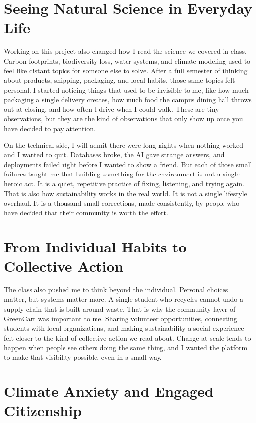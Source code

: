 \documentclass[12pt,letterpaper]{article}
\begin{document}
\section{Seeing Natural Science in Everyday Life}

Working on this project also changed how I read the science we covered in class. Carbon footprints, biodiversity loss, water systems, and climate modeling used to feel like distant topics for someone else to solve. After a full semester of thinking about products, shipping, packaging, and local habits, those same topics felt personal. I started noticing things that used to be invisible to me, like how much packaging a single delivery creates, how much food the campus dining hall throws out at closing, and how often I drive when I could walk. These are tiny observations, but they are the kind of observations that only show up once you have decided to pay attention.

On the technical side, I will admit there were long nights when nothing worked and I wanted to quit. Databases broke, the AI gave strange answers, and deployments failed right before I wanted to show a friend. But each of those small failures taught me that building something for the environment is not a single heroic act. It is a quiet, repetitive practice of fixing, listening, and trying again. That is also how sustainability works in the real world. It is not a single lifestyle overhaul. It is a thousand small corrections, made consistently, by people who have decided that their community is worth the effort.

\section{From Individual Habits to Collective Action}

The class also pushed me to think beyond the individual. Personal choices matter, but systems matter more. A single student who recycles cannot undo a supply chain that is built around waste. That is why the community layer of GreenCart was important to me. Sharing volunteer opportunities, connecting students with local organizations, and making sustainability a social experience felt closer to the kind of collective action we read about. Change at scale tends to happen when people see others doing the same thing, and I wanted the platform to make that visibility possible, even in a small way.

\section{Climate Anxiety and Engaged Citizenship}
\end{document}
